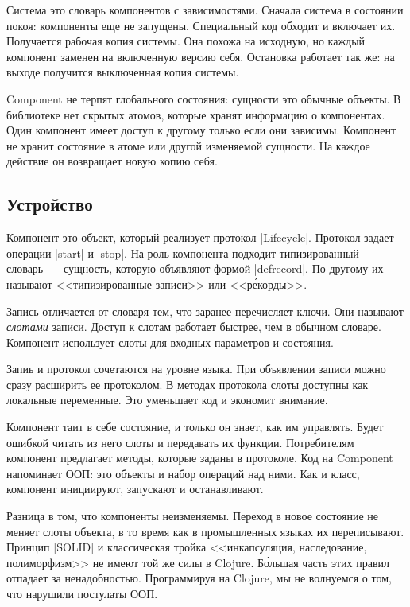 Система это словарь компонентов с зависимостями. Сначала система в состоянии
покоя: компоненты еще не запущены. Специальный код обходит и включает
их. Получается рабочая копия системы. Она похожа на исходную, но каждый
компонент заменен на включенную версию себя. Остановка работает так же: на
выходе получится выключенная копия системы.

Component не терпят глобального состояния: сущности это обычные объекты. В
библиотеке нет скрытых атомов, которые хранят информацию о компонентах. Один
компонент имеет доступ к другому только если они зависимы. Компонент не хранит
состояние в атоме или другой изменяемой сущности. На каждое действие он
возвращает новую копию себя.

\subsection{Устройство}

Компонент это объект, который реализует протокол \spverb|Lifecycle|. Протокол
задает операции \spverb|start| и \spverb|stop|. На роль компонента подходит
типизированный словарь~--- сущность, которую объявляют формой
\spverb|defrecord|. По-другому их называют <<типизированные записи>> или
<<р\'{е}корды>>.

Запись отличается от словаря тем, что заранее перечисляет ключи. Они называют
\emph{слотами} записи. Доступ к слотам работает быстрее, чем в обычном
словаре. Компонент использует слоты для входных параметров и состояния.

Запиь и протокол сочетаются на уровне языка. При объявлении записи можно сразу
расширить ее протоколом. В методах протокола слоты доступны как локальные
переменные. Это уменьшает код и экономит внимание.

Компонент таит в себе состояние, и только он знает, как им управлять. Будет
ошибкой читать из него слоты и передавать их функции. Потребителям компонент
предлагает методы, которые заданы в протоколе. Код на Component напоминает ООП:
это объекты и набор операций над ними. Как и класс, компонент инициируют,
запускают и останавливают.

Разница в том, что компоненты неизменяемы. Переход в новое состояние не меняет
слоты объекта, в то время как в промышленных языках их переписывают. Принцип
\spverb|SOLID| и классическая тройка <<инкапсуляция, наследование, полиморфизм>>
не имеют той же силы в Clojure. Б\'{о}льшая часть этих правил отпадает за
ненадобностью. Программируя на Clojure, мы не волнуемся о том, что нарушили
постулаты ООП.

